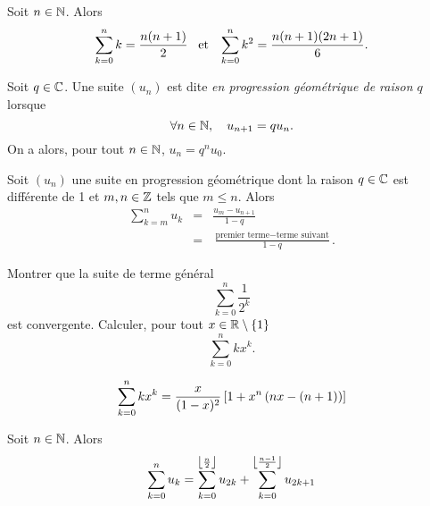 \documentclass{magnolia}
\begin{document}
\begin{proposition}
  Soit $n\in\mathbb{N}$. Alors
  \[\sum_{k=0}^n k=\frac{n(n+1)}{2} \quad\!\text{et}\quad\! \sum_{k=0}^n k^2=\frac{n(n+1)(2n+1)}{6}.\]
  \end{proposition}



\begin{definition}
Soit $q\in\mathbb{C}$. Une suite $(u_n)$ est dite \emph{en progression géométrique de raison $q$} lorsque
\[\forall n \in \mathbb{N},\quad  u_{n+1}= q u_n.\]
On a alors, pour tout $n \in \mathbb{N}$, $u_n = q^n u_0$.
\end{definition}

\begin{proposition}
Soit $(u_n)$ une suite en progression géométrique dont la raison $q\in\mathbb{C}$ est différente de 1 et $m,n\in\mathbb{Z}$ tels que $m\leq n$. Alors
\begin{eqnarray*}
\sum_{k=m}^n u_k
&=& \frac{u_m - u_{n+1}}{1-q}\\
&=& \frac{\text{premier terme}-\text{terme suivant}}{1-q}.
\end{eqnarray*}
\end{proposition}

\begin{exos}
\exo Montrer que la suite de terme général
  \[\sum_{k=0}^n \frac{1}{2^k}\]
  est convergente.
\exo Calculer, pour tout $x\in\mathbb{R}\setminus\left\{1\right\}$
  \[\sum_{k=0}^n k x^k.\]
  \begin{sol}
\[\sum_{k=0}^n k x^k=\frac{x}{(1-x)^2}\left[1+x^n\left(nx-(n+1)\right)\right]\]
  \end{sol}
\end{exos}

\begin{proposition}
Soit $n\in\mathbb{N}$. Alors
  \[\sum_{k=0}^n u_k=\sum_{k=0}^{\left\lfloor\frac{n}{2}\right\rfloor} u_{2k}+
    \sum_{k=0}^{\left\lfloor\frac{n-1}{2}\right\rfloor} u_{2k+1}\]
\end{proposition}

\end{document}
